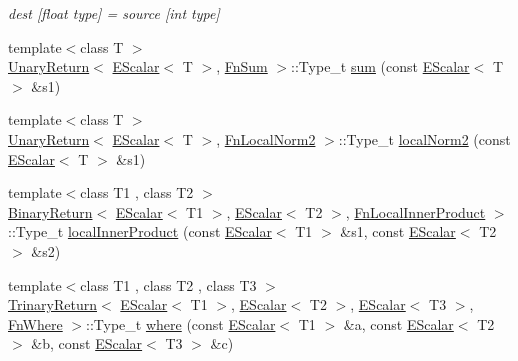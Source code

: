 \begin{DoxyCompactItemize}
\begin{DoxyCompactList}\small\item\em dest \mbox{[}float type\mbox{]} = source \mbox{[}int type\mbox{]} \end{DoxyCompactList}\item 
{\footnotesize template$<$class T $>$ }\\\mbox{\hyperlink{structENSEM_1_1UnaryReturn}{Unary\+Return}}$<$ \mbox{\hyperlink{classENSEM_1_1EScalar}{E\+Scalar}}$<$ T $>$, \mbox{\hyperlink{structENSEM_1_1FnSum}{Fn\+Sum}} $>$\+::Type\+\_\+t \mbox{\hyperlink{group__escalar_gae544517401e03767c9194bfe3736df37}{sum}} (const \mbox{\hyperlink{classENSEM_1_1EScalar}{E\+Scalar}}$<$ T $>$ \&s1)
\item 
{\footnotesize template$<$class T $>$ }\\\mbox{\hyperlink{structENSEM_1_1UnaryReturn}{Unary\+Return}}$<$ \mbox{\hyperlink{classENSEM_1_1EScalar}{E\+Scalar}}$<$ T $>$, \mbox{\hyperlink{structENSEM_1_1FnLocalNorm2}{Fn\+Local\+Norm2}} $>$\+::Type\+\_\+t \mbox{\hyperlink{group__escalar_ga5612cd39905e848db7ef691d10437811}{local\+Norm2}} (const \mbox{\hyperlink{classENSEM_1_1EScalar}{E\+Scalar}}$<$ T $>$ \&s1)
\item 
{\footnotesize template$<$class T1 , class T2 $>$ }\\\mbox{\hyperlink{structENSEM_1_1BinaryReturn}{Binary\+Return}}$<$ \mbox{\hyperlink{classENSEM_1_1EScalar}{E\+Scalar}}$<$ T1 $>$, \mbox{\hyperlink{classENSEM_1_1EScalar}{E\+Scalar}}$<$ T2 $>$, \mbox{\hyperlink{structENSEM_1_1FnLocalInnerProduct}{Fn\+Local\+Inner\+Product}} $>$\+::Type\+\_\+t \mbox{\hyperlink{group__escalar_ga0013b1f4312c45e970912e4df1f55f65}{local\+Inner\+Product}} (const \mbox{\hyperlink{classENSEM_1_1EScalar}{E\+Scalar}}$<$ T1 $>$ \&s1, const \mbox{\hyperlink{classENSEM_1_1EScalar}{E\+Scalar}}$<$ T2 $>$ \&s2)
\item 
{\footnotesize template$<$class T1 , class T2 , class T3 $>$ }\\\mbox{\hyperlink{structENSEM_1_1TrinaryReturn}{Trinary\+Return}}$<$ \mbox{\hyperlink{classENSEM_1_1EScalar}{E\+Scalar}}$<$ T1 $>$, \mbox{\hyperlink{classENSEM_1_1EScalar}{E\+Scalar}}$<$ T2 $>$, \mbox{\hyperlink{classENSEM_1_1EScalar}{E\+Scalar}}$<$ T3 $>$, \mbox{\hyperlink{structENSEM_1_1FnWhere}{Fn\+Where}} $>$\+::Type\+\_\+t \mbox{\hyperlink{group__escalar_ga1b68bb6fff59089642921a334fde6ef5}{where}} (const \mbox{\hyperlink{classENSEM_1_1EScalar}{E\+Scalar}}$<$ T1 $>$ \&a, const \mbox{\hyperlink{classENSEM_1_1EScalar}{E\+Scalar}}$<$ T2 $>$ \&b, const \mbox{\hyperlink{classENSEM_1_1EScalar}{E\+Scalar}}$<$ T3 $>$ \&c)

\end{DoxyCompactItemize}
